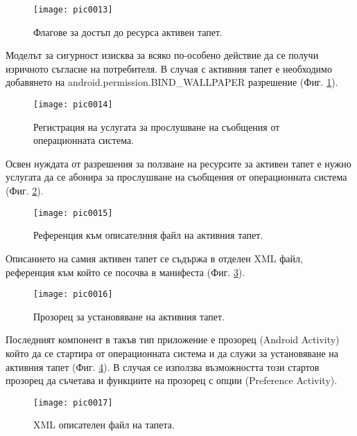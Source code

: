\begin{figure}[h]
  \centering
  \texttt{[image: pic0013]}
  \caption{Флагове за достъп до ресурса активен тапет.}
\label{fig:pic0013}
\end{figure}
\FloatBarrier

Моделът за сигурност изисква за всяко по-особено действие да се получи изричното съгласие на потребителя. В случая с активния тапет е необходимо добавянето на android.permission.BIND\_WALLPAPER разрешение (Фиг. \ref{fig:pic0013}).

\begin{figure}[h]
  \centering
  \texttt{[image: pic0014]}
  \caption{Регистрация на услугата за прослушване на съобщения от операционната система.}
\label{fig:pic0014}
\end{figure}
\FloatBarrier

Освен нуждата от разрешения за ползване на ресурсите за активен тапет е нужно услугата да се абонира за прослушване на съобщения от операционната система (Фиг. \ref{fig:pic0014}).

\begin{figure}[h]
  \centering
  \texttt{[image: pic0015]}
  \caption{Референция към описателния файл на активния тапет.}
\label{fig:pic0015}
\end{figure}
\FloatBarrier

Описанието на самия активен тапет се съдържа в отделен XML файл, референция към който се посочва в манифеста (Фиг. \ref{fig:pic0015}).

\begin{figure}[h]
  \centering
  \texttt{[image: pic0016]}
  \caption{Прозорец за установяване на активния тапет.}
\label{fig:pic0016}
\end{figure}
\FloatBarrier

Последният компонент в такъв тип приложение е прозорец (Android Activity) който да се стартира от операционната система и да служи за установяване на активния тапет (Фиг. \ref{fig:pic0016}). В случая се използва възможността този стартов прозорец да съчетава и функциите на прозорец с опции (Preference Activity).

\begin{figure}[h]
  \centering
  \texttt{[image: pic0017]}
  \caption{XML описателен файл на тапета.}
\label{fig:pic0017}
\end{figure}
\FloatBarrier

